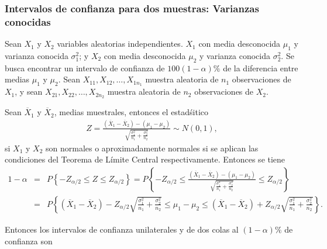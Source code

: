 \documentclass[a4paper]{report} %
\begin{document}
\subsubsection{Intervalos de confianza para dos muestras: Varianzas conocidas}

Sean $X_{1}$ y $X_{2}$ variables aleatorias independientes. $X_{1}$ con media desconocida $\mu_{1}$ y varianza conocida $\sigma_{1}^{2}$; y $X_{2}$ con media desconocida $\mu_{2}$ y varianza conocida $\sigma_{2}^{2}$. Se busca encontrar un intervalo de confianza de $100\left(1-\alpha\right)\%$ de la diferencia entre medias $\mu_{1}$ y $\mu_{2}$. Sean $X_{11},X_{12},\ldots,X_{1n_{1}}$ muestra aleatoria de $n_{1}$ observaciones de $X_{1}$, y sean $X_{21},X_{22},\ldots,X_{2n_{2}}$ muestra aleatoria de $n_{2}$ observaciones de $X_{2}$.\medskip

Sean $\overline{X}_{1}$ y $\overline{X}_{2}$, medias muestrales, entonces el estad\'sitico 
\begin{eqnarray}
Z=\frac{\left(\overline{X}_{1}-\overline{X}_{2}\right)-\left(\mu_{1}-\mu_{2}\right)}{\sqrt{\frac{\sigma_{1}^{2}}{n_{1}}+\frac{\sigma_{2}^{2}}{n_{2}}}}\sim N\left(0,1\right),\end{eqnarray}
si $X_{1}$ y $X_{2}$ son normales o aproximadamente normales si se aplican las condiciones del Teorema de L\'imite Central respectivamente. Entonces se tiene
\begin{eqnarray}
1-\alpha&=& P\left\{-Z_{\alpha/2}\leq Z\leq Z_{\alpha/2}\right\}=P\left\{-Z_{\alpha/2}\leq \frac{\left(\overline{X}_{1}-\overline{X}_{2}\right)-\left(\mu_{1}-\mu_{2}\right)}{\sqrt{\frac{\sigma_{1}^{2}}{n_{1}}+\frac{\sigma_{2}^{2}}{n_{2}}}}\leq Z_{\alpha/2}\right\}\\
&=&P\left\{\left(\overline{X}_{1}-\overline{X}_{2}\right)-Z_{\alpha/2}\sqrt{\frac{\sigma_{1}^{2}}{n_{1}}+\frac{\sigma_{2}^{2}}{n_{2}}}\leq \mu_{1}-\mu_{2}\leq \left(\overline{X}_{1}-\overline{X}_{2}\right)+Z_{\alpha/2}\sqrt{\frac{\sigma_{1}^{2}}{n_{1}}+\frac{\sigma_{2}^{2}}{n_{2}}}\right\}.
\end{eqnarray}

Entonces los intervalos de confianza unilaterales y de dos colas al $\left(1-\alpha\right)\%$ de confianza son 
\end{document}
